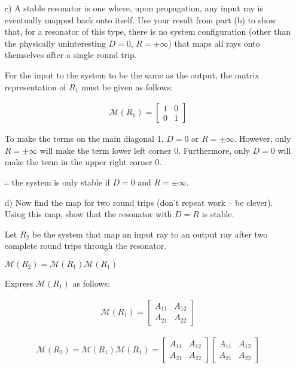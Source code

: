 \documentclass[fleqn]{article}
\begin{document}
\begin{enumerate}[nolistsep]
			\item[c)] A stable resonator is one where, upon propagation, any input ray is eventually mapped back onto itself. Use your result from part (b) to show that, for a resonator of this type, there is no system configuration (other than the physically uninteresting $D = 0$, $R = \pm \infty$) that maps all rays onto themselves after a single round trip.
			
			For the input to the system to be the same as the output, the matrix representation of $R_1$ must be given as follows:
			
			\begin{align*}
				\mathcal{M}(R_1) = \begin{bmatrix}1 & 0\\ 0 & 1\end{bmatrix}
			\end{align*}
			
			To make the terms on the main diagonal $1$, $D = 0$ or $R = \pm\infty$. However, only $R = \pm\infty$ will make the term lower left corner $0$. Furthermore, only $D = 0$ will make the term in the upper right corner $0$.
			
			$\therefore$ the system is only stable if $D=0$ and $R=\pm\infty$.			
			\pagebreak
			\item[d)] Now find the map for two round trips (don’t repeat work – be clever). Using this map, show that the resonator with $D = R$ is stable.
			
			Let $R_2$ be the system that map an input ray to an output ray after two complete round trips through the resonator.
			
			$\mathcal{M}(R_2) = \mathcal{M}(R_1)\mathcal{M}(R_1)$
			
			Express $\mathcal{M}(R_1)$ as follows:
			
			\begin{align*}
				\mathcal{M}(R_1) = \begin{bmatrix}A_{11} & A_{12}\\ A_{21} & A_{22}\end{bmatrix}
			\end{align*}
			
			\vspace{-12pt}
			
			\begin{align*}
				\mathcal{M}(R_2) = \mathcal{M}(R_1)\mathcal{M}(R_1) = \begin{bmatrix}A_{11} & A_{12}\\ A_{21} & A_{22}\end{bmatrix}\begin{bmatrix}A_{11} & A_{12}\\ A_{21} & A_{22}\end{bmatrix}
			\end{align*}
			

\end{enumerate}
\end{document}
